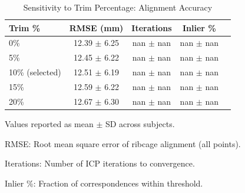 
\begin{table}[h]
\centering
\caption{Sensitivity to Trim Percentage: Alignment Accuracy}
\label{tab:sensitivity_trim}
\begin{tabular}{lcccc}
\hline
\textbf{Trim \%} & \textbf{RMSE (mm)} & \textbf{Iterations} & \textbf{Inlier \%} \\
\hline
0\% & 12.39 $\pm$ 6.25 & nan $\pm$ nan & nan $\pm$ nan \\
5\% & 12.45 $\pm$ 6.22 & nan $\pm$ nan & nan $\pm$ nan \\
10\% (selected) & 12.51 $\pm$ 6.19 & nan $\pm$ nan & nan $\pm$ nan \\
15\% & 12.59 $\pm$ 6.22 & nan $\pm$ nan & nan $\pm$ nan \\
20\% & 12.67 $\pm$ 6.30 & nan $\pm$ nan & nan $\pm$ nan \\
\hline
\end{tabular}
\begin{tablenotes}
\small
\item Values reported as mean $\pm$ SD across subjects.
\item RMSE: Root mean square error of ribcage alignment (all points).
\item Iterations: Number of ICP iterations to convergence.
\item Inlier \%: Fraction of correspondences within threshold.
\end{tablenotes}
\end{table}
